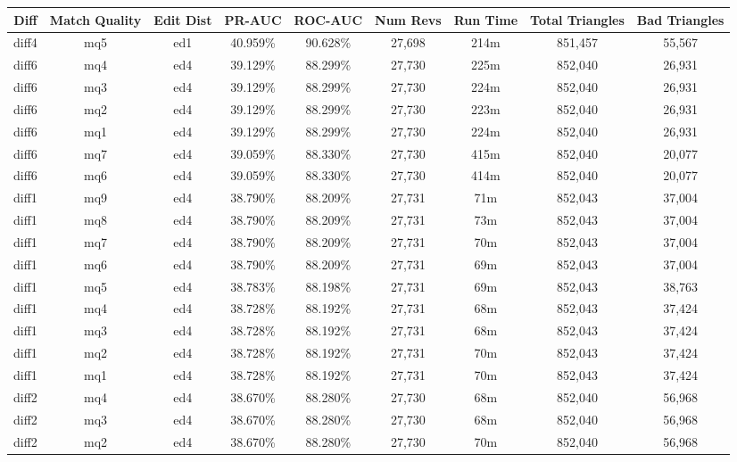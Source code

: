 \begin{sidewaystable}[!ph]
  \begin{center}
    \begin{tabular}{|c|c|c||c|c||c|c|c|c|}
\hline
Diff & Match Quality & Edit Dist
        & PR-AUC & ROC-AUC
        & Num Revs & Run Time
        & Total Triangles & Bad Triangles \\
\hline
\hline
diff4 & mq5 & ed1 & 40.959\% & 90.628\% & 27,698 & 214m & 851,457 & 55,567 \\
diff6 & mq4 & ed4 & 39.129\% & 88.299\% & 27,730 & 225m & 852,040 & 26,931 \\
diff6 & mq3 & ed4 & 39.129\% & 88.299\% & 27,730 & 224m & 852,040 & 26,931 \\
diff6 & mq2 & ed4 & 39.129\% & 88.299\% & 27,730 & 223m & 852,040 & 26,931 \\
diff6 & mq1 & ed4 & 39.129\% & 88.299\% & 27,730 & 224m & 852,040 & 26,931 \\
diff6 & mq7 & ed4 & 39.059\% & 88.330\% & 27,730 & 415m & 852,040 & 20,077 \\
diff6 & mq6 & ed4 & 39.059\% & 88.330\% & 27,730 & 414m & 852,040 & 20,077 \\
diff1 & mq9 & ed4 & 38.790\% & 88.209\% & 27,731 & 71m & 852,043 & 37,004 \\
diff1 & mq8 & ed4 & 38.790\% & 88.209\% & 27,731 & 73m & 852,043 & 37,004 \\
diff1 & mq7 & ed4 & 38.790\% & 88.209\% & 27,731 & 70m & 852,043 & 37,004 \\
diff1 & mq6 & ed4 & 38.790\% & 88.209\% & 27,731 & 69m & 852,043 & 37,004 \\
diff1 & mq5 & ed4 & 38.783\% & 88.198\% & 27,731 & 69m & 852,043 & 38,763 \\
diff1 & mq4 & ed4 & 38.728\% & 88.192\% & 27,731 & 68m & 852,043 & 37,424 \\
diff1 & mq3 & ed4 & 38.728\% & 88.192\% & 27,731 & 68m & 852,043 & 37,424 \\
diff1 & mq2 & ed4 & 38.728\% & 88.192\% & 27,731 & 70m & 852,043 & 37,424 \\
diff1 & mq1 & ed4 & 38.728\% & 88.192\% & 27,731 & 70m & 852,043 & 37,424 \\
diff2 & mq4 & ed4 & 38.670\% & 88.280\% & 27,730 & 68m & 852,040 & 56,968 \\
diff2 & mq3 & ed4 & 38.670\% & 88.280\% & 27,730 & 68m & 852,040 & 56,968 \\
diff2 & mq2 & ed4 & 38.670\% & 88.280\% & 27,730 & 70m & 852,040 & 56,968 \\

\end{tabular}
\end{center}
\end{sidewaystable}
